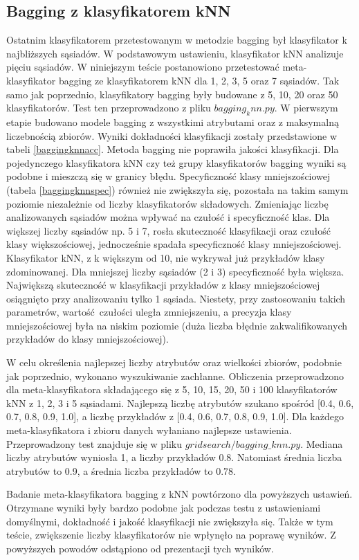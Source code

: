 \subsection{Bagging z klasyfikatorem kNN}
Ostatnim klasyfikatorem przetestowanym w metodzie bagging był klasyfikator k najbliższych sąsiadów. W podstawowym ustawieniu, klasyfikator kNN analizuje pięciu sąsiadów. W niniejszym teście postanowiono przetestować meta-klasyfikator bagging ze klasyfikatorem kNN dla 1, 2, 3, 5 oraz 7 sąsiadów. Tak samo jak poprzednio, klasyfikatory bagging były budowane z 5, 10, 20 oraz 50 klasyfikatorów. Test ten przeprowadzono z pliku $bagging_knn.py$. W pierwszym etapie budowano modele bagging z wszystkimi atrybutami oraz z maksymalną liczebnością zbiorów. Wyniki dokładności klasyfikacji zostały przedstawione w tabeli \ref{baggingknnacc}. Metoda bagging nie poprawiła jakości klasyfikacji. Dla pojedynczego klasyfikatora kNN czy też grupy klasyfikatorów bagging wyniki są podobne i mieszczą się w granicy błędu. Specyficzność klasy mniejszościowej (tabela \ref{baggingknnspec}) również nie zwiększyła się, pozostała na takim samym poziomie niezależnie od liczby klasyfikatorów składowych. Zmieniając liczbę analizowanych sąsiadów można wpływać na czułość i specyficzność klas. Dla większej liczby sąsiadów np. 5 i 7, rosła skuteczność klasyfikacji oraz czułość klasy większościowej, jednocześnie spadała specyficzność klasy mniejszościowej. Klasyfikator kNN, z k większym od 10, nie wykrywał już przykładów klasy zdominowanej. Dla mniejszej liczby sąsiadów (2 i 3) specyficzność była większa. Największą skuteczność w klasyfikacji przykładów z klasy mniejszościowej osiągnięto przy analizowaniu tylko 1 sąsiada. Niestety, przy zastosowaniu takich parametrów, wartość czułości uległa zmniejszeniu, a precyzja klasy mniejszościowej była na niskim poziomie (duża liczba błędnie zakwalifikowanych przykładów do klasy mniejszościowej). \par
W celu określenia najlepszej liczby atrybutów oraz wielkości zbiorów, podobnie jak poprzednio, wykonano wyszukiwanie zachłanne. Obliczenia przeprowadzono dla meta-klasyfikatora składającego się z 5, 10, 15, 20, 50 i 100 klasyfikatorów kNN z 1, 2, 3 i 5 sąsiadami. Najlepszą liczbę atrybutów szukano spośród [0.4, 0.6, 0.7, 0.8, 0.9, 1.0], a liczbę przykładów z [0.4, 0.6, 0.7, 0.8, 0.9, 1.0]. Dla każdego meta-klasyfikatora i zbioru danych wyłaniano najlepsze ustawienia. Przeprowadzony test znajduje się w pliku $gridsearch/bagging\_knn.py$. Mediana liczby atrybutów wyniosła 1, a liczby przykładów 0.8. Natomiast średnia liczba atrybutów to 0.9, a średnia liczba przykładów to 0.78. \par
Badanie meta-klasyfikatora bagging z kNN powtórzono dla powyższych ustawień. Otrzymane wyniki były bardzo podobne jak podczas testu z ustawieniami domyślnymi, dokładność i jakość klasyfikacji nie zwiększyła się. Także w tym teście, zwiększenie liczby klasyfikatorów nie wpłynęło na poprawę wyników. Z powyższych powodów odstąpiono od prezentacji tych wyników.


